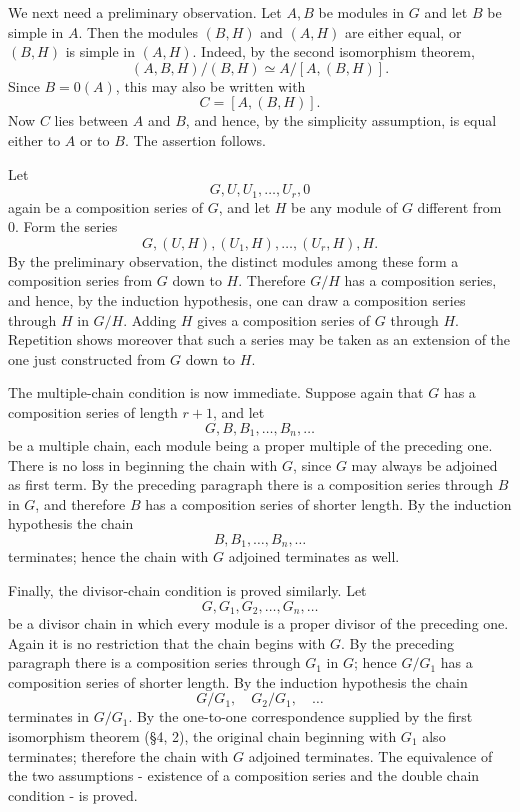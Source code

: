 \documentclass[11pt]{article}
\begin{document}
We next need a preliminary observation. Let \(A,B\) be modules in \(G\)
and let \(B\) be simple in \(A\). Then the modules \((B,H)\) and
\((A,H)\) are either equal, or \((B,H)\) is simple in \((A,H)\). Indeed,
by the second isomorphism theorem, \[
  (A,B,H)/(B,H) \simeq A/[A,(B,H)].
\] Since \(B=0(A)\), this may also be written with \[
  C=[A,(B,H)].
\] Now \(C\) lies between \(A\) and \(B\), and hence, by the simplicity
assumption, is equal either to \(A\) or to \(B\). The assertion follows.

Let \[
  G,U,U_1,
\ldots,U_r,0
\] again be a composition series of \(G\), and let \(H\) be any module
of \(G\) different from \(0\). Form the series \[
  G,(U,H),(U_1,H),
\ldots,(U_r,H),H.
\] By the preliminary observation, the distinct modules among these form
a composition series from \(G\) down to \(H\). Therefore \(G/H\) has a
composition series, and hence, by the induction hypothesis, one can draw
a composition series through \(H\) in \(G/H\). Adding \(H\) gives a
composition series of \(G\) through \(H\). Repetition shows moreover
that such a series may be taken as an extension of the one just
constructed from \(G\) down to \(H\).

The multiple-chain condition is now immediate. Suppose again that \(G\)
has a composition series of length \(r+1\), and let \[
  G,B,B_1,
\ldots,B_n,
\ldots
\] be a multiple chain, each module being a proper multiple of the
preceding one. There is no loss in beginning the chain with \(G\), since
\(G\) may always be adjoined as first term. By the preceding paragraph
there is a composition series through \(B\) in \(G\), and therefore
\(B\) has a composition series of shorter length. By the induction
hypothesis the chain \[
  B,B_1,
\ldots,B_n,
\ldots
\] terminates; hence the chain with \(G\) adjoined terminates as well.

Finally, the divisor-chain condition is proved similarly. Let \[
  G,G_1,G_2,
\ldots,G_n,
\ldots
\] be a divisor chain in which every module is a proper divisor of the
preceding one. Again it is no restriction that the chain begins with
\(G\). By the preceding paragraph there is a composition series through
\(G_1\) in \(G\); hence \(G/G_1\) has a composition series of shorter
length. By the induction hypothesis the chain \[
  G/G_1,
  \quad G_2/G_1,
  \quad \ldots
\] terminates in \(G/G_1\). By the one-to-one correspondence supplied by
the first isomorphism theorem (§4, 2), the original chain beginning with
\(G_1\) also terminates; therefore the chain with \(G\) adjoined
terminates. The equivalence of the two assumptions - existence of a
composition series and the double chain condition - is proved.
\end{document}
